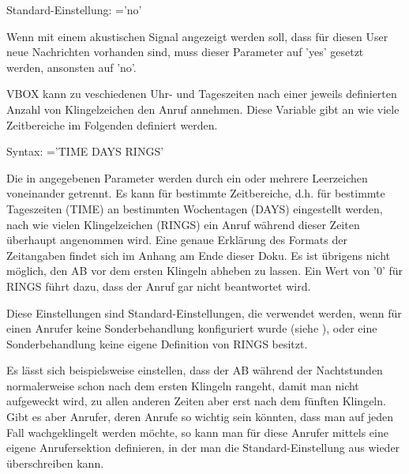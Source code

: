 \begin{description}

    Standard-Einstellung: ='no'
    
    Wenn mit einem akustischen Signal angezeigt werden soll, dass für diesen User 
    neue Nachrichten vorhanden sind, muss dieser Parameter auf 'yes' gesetzt werden, 
    ansonsten auf 'no'.
    


    VBOX kann zu veschiedenen Uhr- und Tageszeiten nach einer jeweils definierten Anzahl 
    von Klingelzeichen den Anruf annehmen. Diese Variable gibt an wie viele Zeitbereiche
    im Folgenden definiert werden.


    Syntax: ='TIME DAYS RINGS'
    
    Die in  angegebenen Parameter werden durch ein oder mehrere 
    Leerzeichen voneinander getrennt. Es kann für bestimmte Zeitbereiche, d.h. für bestimmte 
    Tageszeiten (TIME) an bestimmten Wochentagen (DAYS) eingestellt werden, nach wie vielen 
    Klingelzeichen (RINGS) ein Anruf während dieser Zeiten überhaupt angenommen wird. Eine genaue 
    Erklärung des Formats der Zeitangaben findet sich im Anhang am Ende dieser Doku. Es ist 
    übrigens nicht möglich, den AB vor dem ersten Klingeln abheben zu lassen. Ein Wert von 
    '0' für RINGS führt dazu, dass der Anruf gar nicht beantwortet wird.

    Diese Einstellungen sind Standard-Einstellungen, die verwendet werden, wenn für einen Anrufer 
    keine Sonderbehandlung konfiguriert wurde (siehe ), oder eine 
    Sonderbehandlung keine eigene Definition von RINGS besitzt.

    Es lässt sich beispielsweise einstellen, dass der AB während der Nachtstunden normalerweise 
    schon nach dem ersten Klingeln rangeht, damit man nicht aufgeweckt wird, zu allen anderen 
    Zeiten aber erst nach dem fünften Klingeln. Gibt es aber Anrufer, deren Anrufe so wichtig 
    sein könnten, dass man auf jeden Fall wachgeklingelt werden möchte, so kann man für diese 
    Anrufer mittels  eine eigene Anrufersektion definieren, in der 
    man die Standard-Einstellung aus  wieder überschreiben kann.
    
\end{description}

